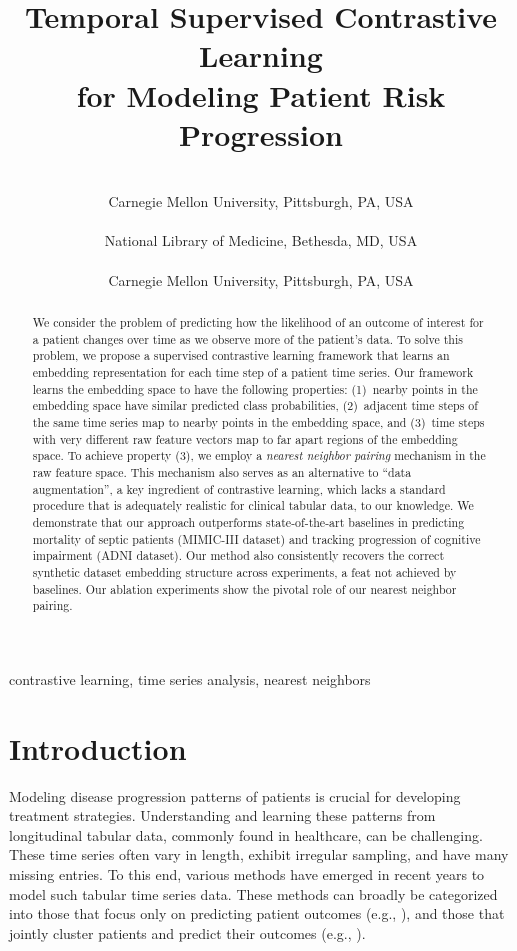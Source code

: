 \documentclass[pmlr,twocolumn,10pt]{jmlr} %
\title[Temporal Supervised Contrastive Learning]{\vspace{-.75em}Temporal Supervised Contrastive Learning \\ for Modeling Patient Risk Progression\vspace{-.25em}}
\author{%
\Name{Shahriar Noroozizadeh}
\Email{snoroozi@cs.cmu.edu}\\
\addr Carnegie Mellon University, Pittsburgh, PA, USA
\\
\Name{Jeremy C. Weiss}
\Email{jeremy.weiss@nih.gov}\\
\addr National Library of Medicine, Bethesda, MD, USA
\\
\Name{George H. Chen}
\Email{georgechen@cmu.edu}\\
\addr Carnegie Mellon University, Pittsburgh, PA, USA
\vspace{-3.5em}
}
\begin{document}
\maketitle

\begin{abstract}
We consider the problem of predicting how the likelihood of an outcome of interest for a patient changes over time as we observe more of the patient's data.
To solve this problem, we propose a supervised contrastive learning framework
that learns an embedding representation for each time step of a patient time series.
Our framework learns the embedding space to have the following properties:
(1)~nearby points in the embedding space have similar predicted class probabilities,
(2)~adjacent time steps of the same time series map to nearby points in the embedding space,
and (3)~time steps with very different raw feature vectors map to far apart regions of the embedding space.
To achieve property (3), we employ a \emph{nearest neighbor pairing} mechanism in the raw feature space. 
This mechanism also serves as an alternative to ``data augmentation'', a key ingredient of contrastive learning, which lacks a standard procedure that is adequately realistic for clinical tabular data, to our knowledge.
We demonstrate that our approach outperforms state-of-the-art baselines in predicting mortality of septic patients (MIMIC-III dataset) and tracking progression of cognitive impairment (ADNI dataset). Our method also consistently recovers the correct synthetic dataset embedding structure across experiments, a feat not achieved by baselines. 
Our ablation experiments show the pivotal role of our nearest neighbor pairing.
\end{abstract}
\begin{keywords}
contrastive learning, time series analysis, nearest neighbors
\end{keywords}

\setlength{\abovedisplayskip}{4pt plus 1.5pt}
\setlength{\belowdisplayskip}{4pt plus 1.5pt}
\setlength{\abovedisplayshortskip}{2pt plus 1.5pt}
\setlength{\belowdisplayshortskip}{2pt plus 1.5pt} 

\vspace{-1em}
\section{Introduction}
\vspace{-.25em}
Modeling disease progression patterns of patients is crucial for developing treatment strategies. Understanding and learning these patterns from longitudinal tabular data, commonly found in healthcare, can be challenging. These time series often vary in length, exhibit irregular sampling, and have many missing entries.
To this end, various methods have emerged in recent years to model such tabular time series data. These methods can broadly be categorized into those that focus only on predicting patient outcomes (e.g., \citealt{choi2016retain, ma2017dipole, devlin2018bert, mollura2021novel}), and those that jointly cluster patients and predict their outcomes (e.g., \citealt{lee2020temporal, lee2020outcome, huang2021deep, carr2021longitudinal, aguiar2022learning, qin2023t}).
\end{document}
